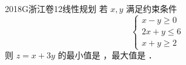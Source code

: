 
\begin{problem}{2018}{G}{浙江卷}{12}{线性规划}
若 $ x,y $ 满足约束条件
\[
\begin{cases}
x-y\geqslant 0\\
2x+y\leqslant 6\\
x+y\geqslant 2
\end{cases}
\]
则 $ z=x+3y $ 的最小值是 \underline{\hspace{4em}}，最大值是 \underline{\hspace{4em}}．
\end{problem}

\begin{answer}

\end{answer}

\begin{solutions}

\end{solutions}
